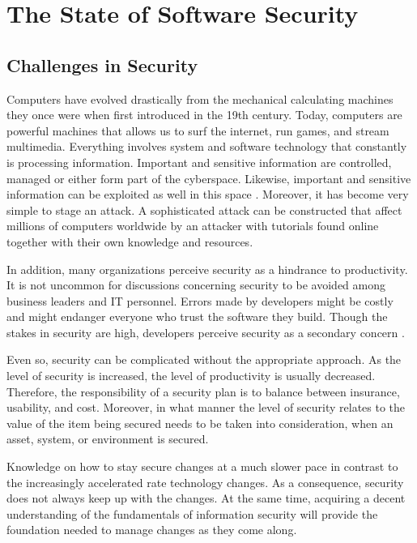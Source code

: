 \section{The State of Software Security}

\subsection{Challenges in Security}\label{sec:challenges-in-is}
Computers have evolved drastically from the mechanical calculating machines they once were when first introduced in the 19th century. Today, computers are powerful machines that allows us to surf the internet, run games, and stream multimedia. Everything involves system and software technology that constantly is processing information. Important and sensitive information are controlled, managed or either form part of the cyberspace. Likewise, important and sensitive information can be exploited as well in this space \cite{Li_2021}. Moreover, it has become very simple to stage an attack. A sophisticated attack can be constructed that affect millions of computers worldwide by an attacker with tutorials found online together with their own knowledge and resources. 

In addition, many organizations perceive security as a hindrance to productivity. It is not uncommon for discussions concerning security to be avoided  among business leaders and IT personnel. Errors made by developers might be costly and might endanger everyone who trust the software they build. Though the stakes in security are high, developers perceive security as a secondary concern \cite{Lopez_2019}. 

Even so, security can be complicated without the appropriate approach. As the level of security is increased, the level of productivity is usually decreased. Therefore, the responsibility of a security plan is to balance between insurance, usability, and cost. Moreover, in what manner the level of security relates to the value of the item being secured needs to be taken into consideration, when an asset, system, or environment is secured. 

Knowledge on how to stay secure changes at a much slower pace in contrast to the increasingly accelerated rate technology changes. As a consequence, security does not always keep up with the changes. At the same time, acquiring a decent understanding of the fundamentals of information security will provide the foundation needed to manage changes as they come along.

